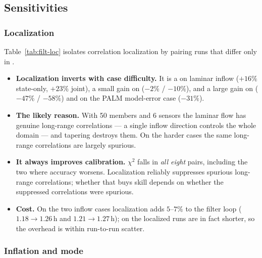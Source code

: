 \subsection{Sensitivities}
\label{sec:filt-sens}

\subsubsection{Localization}
\label{sec:filt-loc}

Table~\ref{tab:filt-loc} isolates correlation localization by pairing runs that
differ only in .

\begin{table}[H]
\centering
\caption{Sequential filtering: effect of turning localization on, holding
truth, case and method knob fixed. $\Delta$ is the change in mean validation
vector RMSE (negative $=$ better).}
\label{tab:filt-loc}
\FiltLocTable
\end{table}

\begin{itemize}[nosep]
  \item \textbf{Localization inverts with case difficulty.} It is a  on laminar inflow ($+16\%$ state-only, $+23\%$ joint), a
        small gain on  ($-2\%$ / $-10\%$), and a large gain
        on  ($-47\%$ / $-58\%$) and on the PALM model-error case
        ($-31\%$).
  \item \textbf{The likely reason.} With 50 members and 6 sensors the laminar
        flow has genuine long-range correlations --- a single inflow direction
        controls the whole domain --- and tapering destroys them. On the harder
        cases the same long-range correlations are largely spurious.
  \item \textbf{It always improves calibration.} $\chi^2$ falls in \emph{all
        eight} pairs, including the two where accuracy worsens. Localization
        reliably suppresses spurious long-range correlations; whether that buys
        skill depends on whether the suppressed correlations were spurious.
  \item \textbf{Cost.} On the two inflow cases localization adds $5$--$7\%$ to
        the filter loop ($1.18 \to 1.26$\,h and $1.21 \to 1.27$\,h); on
         the localized runs are in fact shorter, so the overhead
        is within run-to-run scatter.
\end{itemize}

\subsubsection{Inflation and mode}
\label{sec:filt-knob}

